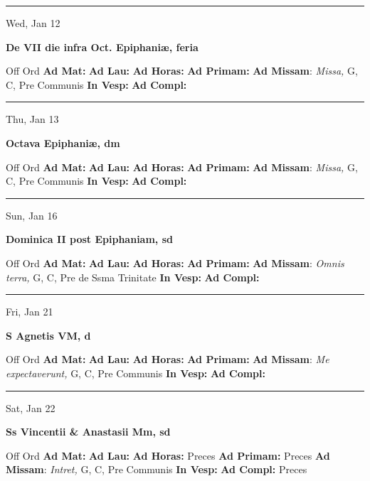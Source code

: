 \documentclass[letterpaper, 10pt]{article}
\begin{document}
\hrule
\begin{center}
Wed, Jan 12
\end{center}\textbf{ \large De VII die infra Oct. Epiphaniæ, \textnormal{\normalsize feria}}
\begin{justify}
Off Ord
\textbf{Ad Mat: }
\textbf{Ad Lau: }
\textbf{Ad Horas: }
\textbf{Ad Primam: }
\textbf{Ad Missam}: \textit{Missa,} G, C, Pre Communis
\textbf{In Vesp: }
\textbf{Ad Compl: }\end{justify}



\hrule
\begin{center}
Thu, Jan 13
\end{center}\textbf{ \large Octava Epiphaniæ, \textnormal{\normalsize dm}}
\begin{justify}
Off Ord
\textbf{Ad Mat: }
\textbf{Ad Lau: }
\textbf{Ad Horas: }
\textbf{Ad Primam: }
\textbf{Ad Missam}: \textit{Missa,} G, C, Pre Communis
\textbf{In Vesp: }
\textbf{Ad Compl: }\end{justify}



\hrule
\begin{center}
Sun, Jan 16
\end{center}\textbf{ \large Dominica II post Epiphaniam, \textnormal{\normalsize sd}}
\begin{justify}
Off Ord
\textbf{Ad Mat: }
\textbf{Ad Lau: }
\textbf{Ad Horas: }
\textbf{Ad Primam: }
\textbf{Ad Missam}: \textit{Omnis terra,} G, C, Pre de Ssma Trinitate
\textbf{In Vesp: }
\textbf{Ad Compl: }\end{justify}



\hrule
\begin{center}
Fri, Jan 21
\end{center}\textbf{ \large S Agnetis VM, \textnormal{\normalsize d}}
\begin{justify}
Off Ord
\textbf{Ad Mat: }
\textbf{Ad Lau: }
\textbf{Ad Horas: }
\textbf{Ad Primam: }
\textbf{Ad Missam}: \textit{Me expectaverunt,} G, C, Pre Communis
\textbf{In Vesp: }
\textbf{Ad Compl: }\end{justify}



\hrule
\begin{center}
Sat, Jan 22
\end{center}\textbf{ \large Ss Vincentii \& Anastasii Mm, \textnormal{\normalsize sd}}
\begin{justify}
Off Ord
\textbf{Ad Mat: }
\textbf{Ad Lau: }
\textbf{Ad Horas: }Preces
\textbf{Ad Primam: }Preces
\textbf{Ad Missam}: \textit{Intret,} G, C, Pre Communis
\textbf{In Vesp: }
\textbf{Ad Compl: }Preces\end{justify}
\end{document}
